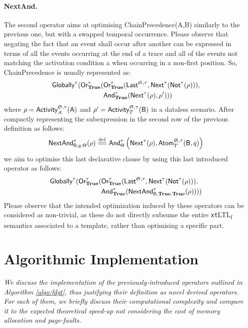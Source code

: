 \documentclass[sigconf]{acmart}
\newcommand{\eqdef}{\overset{\mathrm{def}}{=\joinrel=}}
\begin{document}
\paragraph{NextAnd.} The second operator aims at optimising \textsf{ChainPrecedence(A,B)} similarly to the previous one, but with a swapped temporal occurrence. Please observe that negating the fact that an event shall occur after another can be expressed in terms of all the events occurring at the end of a trace and all of the events not matching the activation condition a when occurring in a non-first position. So, ChainPrecedence is usually represented as:
\[\begin{split}
\textsf{Globally}^\tau(\textsf{Or}^\tau_\textbf{True}(&\textsf{Or}^\tau_\textbf{True}(\textsf{Last}^{\mathfrak{S},\tau},\textsf{Next}^\tau(\textsf{Not}^\tau(\rho))), \\
&\textsf{And}^\tau_\textbf{True}(\textsf{Next}^\tau(\rho),\rho')))
\end{split}\]
where $\rho=\textsf{Activity}^{\mathfrak{S},\tau}_A(\textsf{A})$ and $\rho'=\textsf{Activity}^{\mathfrak{S},\tau}_T(\textsf{B})$ in a dataless scenario. After compactly representing the subexpression in the second row of the previous definition as follows:
\begin{equation}\label{lastEQ}
\textsf{NextAnd}^\tau_{\textsf{B},q,\Theta}(\rho)\eqdef\textsf{And}^\tau_\Theta\left(\textsf{Next}^\tau(\rho),\textsf{Atom}^{\LOG,\tau}_{T}(\textsf{B},q)\right)
\end{equation}
 we %
aim to optimise this last declarative clause by using this last introduced operator as follows:
\begin{equation}\label{qp4}
    \begin{split}
\textsf{Globally}^\tau(\textsf{Or}^\tau_\textbf{True}(&\textsf{Or}^\tau_\textbf{True}(\textsf{Last}^{\mathfrak{S},\tau},\textsf{Next}^\tau(\textsf{Not}^\tau(\rho))), \\
&\textsf{And}^\tau_\textbf{True}(\textsf{NextAnd}^\tau_{\textsf{B},\textbf{True},\textbf{True}}(\rho))))
\end{split}
\end{equation}
Please observe that the intended optimization induced by these operators can be considered as non-trivial, as these do not directly subsume the entire \texttt{xt}LTL\textsubscript{f} semantics associated to a template, rather than optimising a specific part.


\section{Algorithmic Implementation}\label{sec:algos}
\textit{We  discuss the implementation of the previously-introduced operators outlined in Algorithm \ref{algo:fdgt}, thus justifying their definition as novel derived operators. For each of them, we briefly discuss their computational complexity and compare it to the expected theoretical speed-up not considering the cost of memory allocation and page-faults.}\medskip
\end{document}
